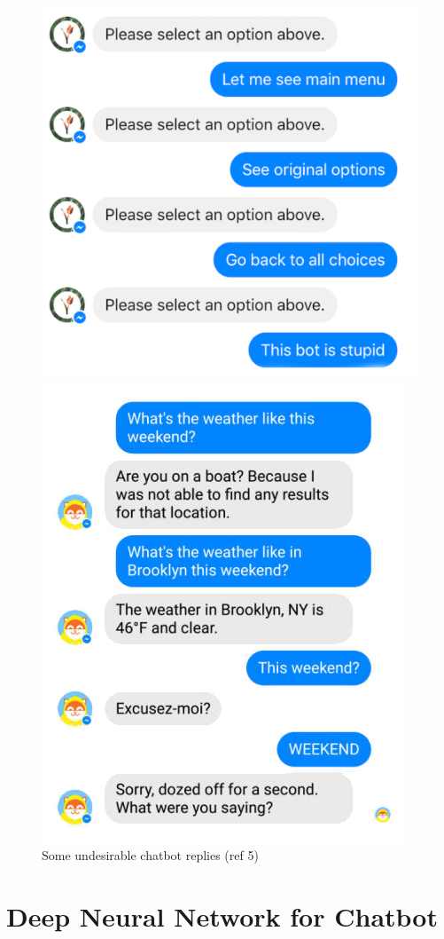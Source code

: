 \documentclass[a4paper,12pt]{report}
\begin{document}
\begin{figure}[H]
\caption{Some undesirable chatbot replies (ref 5)}
\begin{center}
\begin{minipage}{0.49\textwidth}
\includegraphics[scale=.4]{chatbotfail1}
\end{minipage}
\begin{minipage}{0.49\textwidth}
\includegraphics[scale=.45]{chatbotfail2}
\end{minipage}
\end{center}
\end{figure}
\newpage
{\let\clearpage\relax \chapter {Deep Neural Network for Chatbot}}
\end{document}

